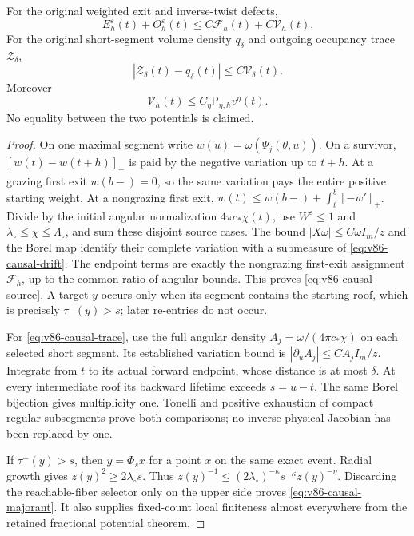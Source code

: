 \begin{theorem}
\label{thm:v86-causal-comparison}
For the original weighted exit and inverse-twist defects,
\begin{equation}\label{eq:v86-causal-source}
 E_h^\varepsilon(t)+O_h^\varepsilon(t)
                 \le C\mathcal F_h(t)+C\mathcal V_h(t).
\end{equation}
For the original short-segment volume density $q_\delta$ and outgoing
occupancy trace $\mathcal Z_\delta$,
\begin{equation}\label{eq:v86-causal-trace}
 |\mathcal Z_\delta(t)-q_\delta(t)|\le C\mathcal V_\delta(t).
\end{equation}
Moreover
\begin{equation}\label{eq:v86-causal-majorant}
 \mathcal V_h(t)\le C_\eta\mathsf P_{\eta,h}v^\eta(t).
\end{equation}
No equality between the two potentials is claimed.
\end{theorem}
\begin{proof}
On one maximal segment write $w(u)=\omega(\Psi_j(\theta,u))$.
On a survivor, $[w(t)-w(t+h)]_+$ is paid by the negative variation
up to $t+h$. At a grazing first exit $w(b-)=0$, so the same variation
pays the entire positive starting weight. At a nongrazing first exit,
$w(t)\le w(b-)+\int_t^b[-w']_+$. Divide by the initial angular
normalization $4\pi c_*\chi(t)$, use $W^\varepsilon\le1$ and
$\lambda_\circ\le\chi\le\Lambda_\circ$, and sum these disjoint
source cases. The bound $|X\omega|\le C\omega I_m/z$ and the
Borel map identify their complete variation with a submeasure of
\eqref{eq:v86-causal-drift}. The endpoint terms are exactly the
nongrazing first-exit assignment $\mathcal F_h$, up to the common
ratio of angular bounds. This proves \eqref{eq:v86-causal-source}.
A target $y$ occurs only when its segment contains the starting roof,
which is precisely $\tau^-(y)>s$; later re-entries do not occur.

For \eqref{eq:v86-causal-trace}, use the full angular density
$A_j=\omega/(4\pi c_*\chi)$ on each selected short segment.
Its established variation bound is
$|\partial_uA_j|\le CA_jI_m/z$. Integrate from $t$ to its actual
forward endpoint, whose distance is at most $\delta$. At every
intermediate roof its backward lifetime exceeds $s=u-t$.
The same Borel bijection gives multiplicity one. Tonelli and positive
exhaustion of compact regular subsegments prove both comparisons;
no inverse physical Jacobian has been replaced by one.

If $\tau^-(y)>s$, then $y=\Phi_sx$ for a point $x$ on the same
exact event. Radial growth gives $z(y)^2\ge2\lambda_\circ s$.
Thus $z(y)^{-1}\le(2\lambda_\circ)^{-\kappa}
 s^{-\kappa}z(y)^{-\eta}$. Discarding the reachable-fiber selector
only on the upper side proves \eqref{eq:v86-causal-majorant}.
It also supplies fixed-count local finiteness almost everywhere
from the retained fractional potential theorem.
\end{proof}

